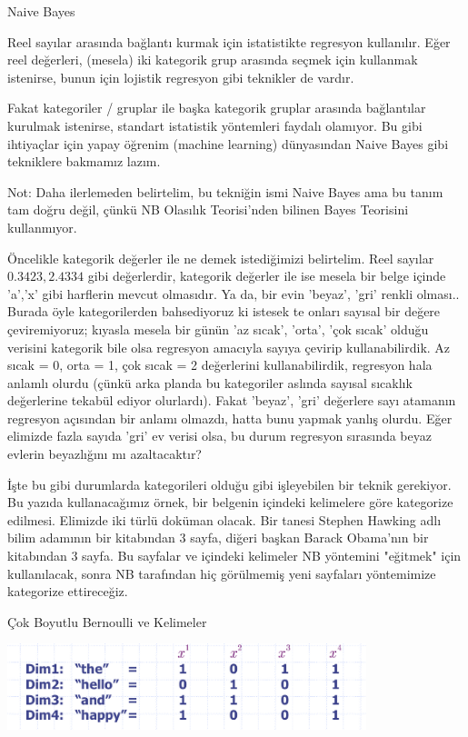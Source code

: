 \documentclass[12pt,fleqn]{article}\usepackage{../../common}
\begin{document}
Naive Bayes

Reel sayılar arasında bağlantı kurmak için istatistikte regresyon
kullanılır. Eğer reel değerleri, (mesela) iki kategorik grup arasında seçmek
için kullanmak istenirse, bunun için lojistik regresyon gibi teknikler de
vardır.

Fakat kategoriler / gruplar ile başka kategorik gruplar arasında
bağlantılar kurulmak istenirse, standart istatistik yöntemleri faydalı
olamıyor. Bu gibi ihtiyaçlar için yapay öğrenim (machine learning)
dünyasından Naive Bayes gibi tekniklere bakmamız lazım.

Not: Daha ilerlemeden belirtelim, bu tekniğin ismi Naive Bayes ama bu tanım
tam doğru değil, çünkü NB Olasılık Teorisi'nden bilinen Bayes Teorisini
kullanmıyor.

Öncelikle kategorik değerler ile ne demek istediğimizi belirtelim. Reel
sayılar $0.3423, 2.4334$ gibi değerlerdir, kategorik değerler ile ise
mesela bir belge içinde 'a','x' gibi harflerin mevcut olmasıdır. Ya da, bir
evin 'beyaz', 'gri' renkli olması.. Burada öyle kategorilerden bahsediyoruz
ki istesek te onları sayısal bir değere çeviremiyoruz; kıyasla mesela bir
günün 'az sıcak', 'orta', 'çok sıcak' olduğu verisini kategorik bile olsa
regresyon amacıyla sayıya çevirip kullanabilirdik. Az sıcak = 0, orta = 1,
çok sıcak = 2 değerlerini kullanabilirdik, regresyon hala anlamlı olurdu
(çünkü arka planda bu kategoriler aslında sayısal sıcaklık değerlerine
tekabül ediyor olurlardı). Fakat 'beyaz', 'gri' değerlere sayı atamanın
regresyon açısından bir anlamı olmazdı, hatta bunu yapmak yanlış
olurdu. Eğer elimizde fazla sayıda 'gri' ev verisi olsa, bu durum regresyon
sırasında beyaz evlerin beyazlığını mı azaltacaktır?

İşte bu gibi durumlarda kategorileri olduğu gibi işleyebilen bir teknik
gerekiyor. Bu yazıda kullanacağımız örnek, bir belgenin içindeki kelimelere
göre kategorize edilmesi. Elimizde iki türlü doküman olacak. Bir tanesi
Stephen Hawking adlı bilim adamının bir kitabından 3 sayfa, diğeri başkan
Barack Obama'nın bir kitabından 3 sayfa. Bu sayfalar ve içindeki kelimeler
NB yöntemini "eğitmek" için kullanılacak, sonra NB tarafından hiç
görülmemiş yeni sayfaları yöntemimize kategorize ettireceğiz.

Çok Boyutlu Bernoulli ve Kelimeler

\includegraphics[height=2.5cm]{dims.png}
\end{document}
